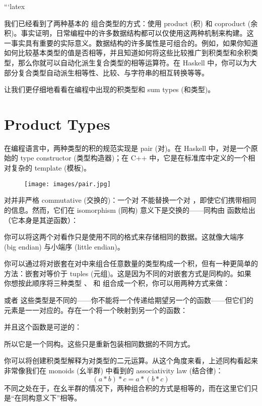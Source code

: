 ```latex

\lettrine[lhang=0.17]{我}{们已经看到了两种基本的} 组合类型的方式：使用 product (积) 和 coproduct (余积)。事实证明，日常编程中的许多数据结构都可以仅使用这两种机制来构建。这一事实具有重要的实际意义。数据结构的许多属性是可组合的。例如，如果你知道如何比较基本类型的值是否相等，并且知道如何将这些比较推广到积类型和余积类型，那么你就可以自动化派生复合类型的相等运算符。在 Haskell 中，你可以为大部分复合类型自动派生相等性、比较、与字符串的相互转换等等。

让我们更仔细地看看在编程中出现的积类型和 sum types (和类型)。

\section{Product Types}

在编程语言中，两种类型的积的规范实现是 pair (对)。在 Haskell 中，对是一个原始的 type constructor (类型构造器)；在 C++ 中，它是在标准库中定义的一个相对复杂的 template (模板)。

\begin{figure}[H]
  \centering
  \texttt{[image: images/pair.jpg]}
\end{figure}

\noindent
对并非严格 commutative (交换的)：一个对  不能替换一个对 ，即使它们携带相同的信息。然而，它们在 isomorphism (同构) 意义下是交换的——同构由  函数给出（它本身是其逆函数）：

你可以将这两个对看作只是使用不同的格式来存储相同的数据。这就像大端序 (big endian) 与小端序 (little endian)。

你可以通过将对嵌套在对中来组合任意数量的类型构成一个积，但有一种更简单的方法：嵌套对等价于 tuples (元组)。这是因为不同的对嵌套方式是同构的。如果你想按此顺序将三种类型 、 和  组合成一个积，你可以用两种方式来做：


或者
这些类型是不同的——你不能将一个传递给期望另一个的函数——但它们的元素是一一对应的。存在一个将一个映射到另一个的函数：

并且这个函数是可逆的：

所以它是一个同构。这些只是重新包装相同数据的不同方式。

你可以将创建积类型解释为对类型的二元运算。从这个角度来看，上述同构看起来非常像我们在 monoids (幺半群) 中看到的 associativity law (结合律)：
\[(a * b) * c = a * (b * c)\]
不同之处在于，在幺半群的情况下，两种组合积的方式是相等的，而在这里它们只是“在同构意义下”相等。

